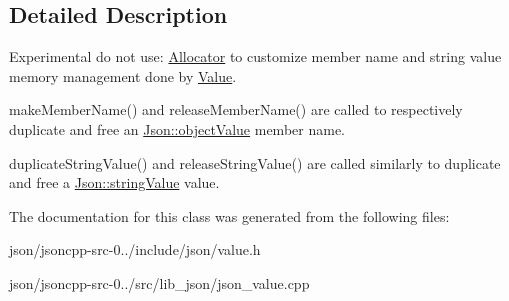 \subsection{Detailed Description}
Experimental do not use\+: \hyperlink{class_allocator}{Allocator} to customize member name and string value memory management done by \hyperlink{class_json_1_1_value}{Value}. 


\begin{DoxyItemize}
\item make\+Member\+Name() and release\+Member\+Name() are called to respectively duplicate and free an \hyperlink{namespace_json_a7d654b75c16a57007925868e38212b4eae8386dcfc36d1ae897745f7b4f77a1f6}{Json\+::object\+Value} member name.
\item duplicate\+String\+Value() and release\+String\+Value() are called similarly to duplicate and free a \hyperlink{namespace_json_a7d654b75c16a57007925868e38212b4ea804ef857affea2d415843c73f261c258}{Json\+::string\+Value} value. 
\end{DoxyItemize}

The documentation for this class was generated from the following files\+:\begin{DoxyCompactItemize}
\item 
json/jsoncpp-\/src-\/0../include/json/value.\+h\item 
json/jsoncpp-\/src-\/0../src/lib\+\_\+json/json\+\_\+value.\+cpp\end{DoxyCompactItemize}
